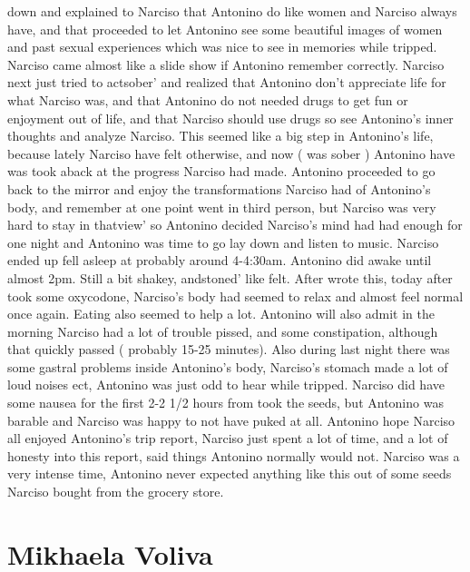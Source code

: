 \documentclass[12pt]{book}
\begin{document}
down and explained to Narciso that Antonino do like women and Narciso always have, and that proceeded to let Antonino see some beautiful images of women and past sexual experiences which was nice to see in memories while tripped. Narciso came almost like a slide show if Antonino remember correctly. Narciso next just tried to actsober' and realized that Antonino don't appreciate life for what Narciso was, and that Antonino do not needed drugs to get fun or enjoyment out of life, and that Narciso should use drugs so see Antonino's inner thoughts and analyze Narciso. This seemed like a big step in Antonino's life, because lately Narciso have felt otherwise, and now ( was sober ) Antonino have was took aback at the progress Narciso had made. Antonino proceeded to go back to the mirror and enjoy the transformations Narciso had of Antonino's body, and remember at one point went in third person, but Narciso was very hard to stay in thatview' so Antonino decided Narciso's mind had had enough for one night and Antonino was time to go lay down and listen to music. Narciso ended up fell asleep at probably around 4-4:30am. Antonino did awake until almost 2pm. Still a bit shakey, andstoned' like felt. After wrote this, today after took some oxycodone, Narciso's body had seemed to relax and almost feel normal once again. Eating also seemed to help a lot. Antonino will also admit in the morning Narciso had a lot of trouble pissed, and some constipation, although that quickly passed ( probably 15-25 minutes). Also during last night there was some gastral problems inside Antonino's body, Narciso's stomach made a lot of loud noises ect, Antonino was just odd to hear while tripped. Narciso did have some nausea for the first 2-2 1/2 hours from took the seeds, but Antonino was barable and Narciso was happy to not have puked at all. Antonino hope Narciso all enjoyed Antonino's trip report, Narciso just spent a lot of time, and a lot of honesty into this report, said things Antonino normally would not. Narciso was a very intense time, Antonino never expected anything like this out of some seeds Narciso bought from the grocery store.



\chapter{Mikhaela Voliva}
\end{document}
